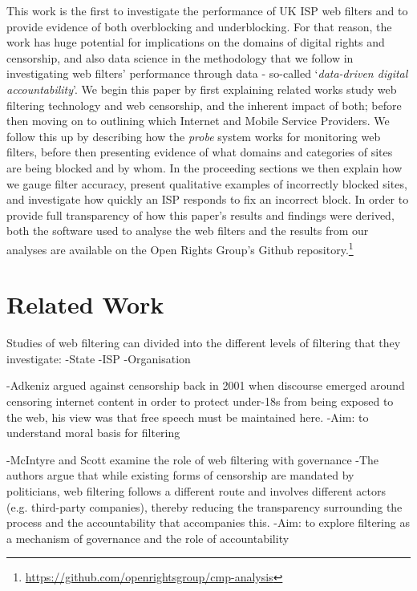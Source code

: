 \documentclass{bmcart}
\begin{document}
This work is the first to investigate the performance of UK ISP web filters and to provide evidence of both overblocking and underblocking.
For that reason, the work has huge potential for implications on the domains of digital rights and censorship, and also data science in the methodology that we follow in investigating web filters' performance through data - so-called `\textit{data-driven digital accountability}'. 
We begin this paper by first explaining related works study web filtering technology and web censorship, and the inherent impact of both; before then moving on to outlining which Internet and Mobile Service Providers.
We follow this up by describing how the \textit{probe} system works for monitoring web filters, before then presenting evidence of what domains and categories of sites are being blocked and by whom.
In the proceeding sections we then explain how we gauge filter accuracy, present qualitative examples of incorrectly blocked sites, and investigate how quickly an ISP responds to fix an incorrect block.
In order to provide full transparency of how this paper's results and findings were derived, both the software used to analyse the web filters and the results from our analyses are available on the Open Rights Group's Github repository.\footnote{\url{https://github.com/openrightsgroup/cmp-analysis}}








\clearpage
\section*{Related Work}

Studies of web filtering can divided into the different levels of filtering that they investigate:
-State
-ISP
-Organisation

\cite{akdeniz2001internet}
-Adkeniz argued against censorship back in 2001 when discourse emerged around censoring internet content in order to protect under-18s from being exposed to the web, his view was that free speech must be maintained here.
-Aim: to understand moral basis for filtering

\cite{mcintyre2008internet}
-McIntyre and Scott examine the role of web filtering with governance
-The authors argue that while existing forms of censorship are mandated by politicians, web filtering follows a different route and involves different actors (e.g. third-party companies), thereby reducing the transparency surrounding the process and the accountability that accompanies this.
-Aim: to explore filtering as a mechanism of governance and the role of accountability
\end{document}

